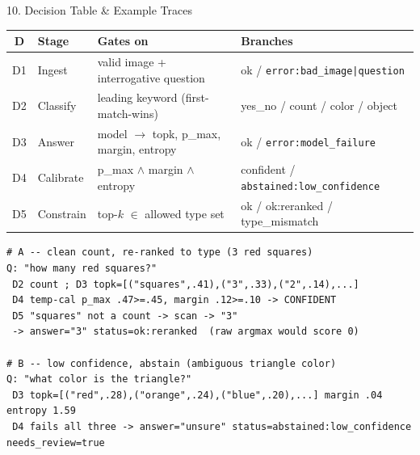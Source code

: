 \documentclass[10pt,aspectratio=169]{beamer}
\begin{document}
\begin{frame}[fragile]{10. Decision Table \& Example Traces}
\begin{table}[h]
\centering\scriptsize
\begin{tabular}{clll}
\toprule
\textbf{D} & \textbf{Stage} & \textbf{Gates on} & \textbf{Branches} \\
\midrule
D1 & Ingest & valid image + interrogative question & ok / \texttt{error:bad\_image|question} \\
D2 & Classify & leading keyword (first-match-wins) & yes\_no / count / color / object \\
D3 & Answer & model $\to$ topk, p\_max, margin, entropy & ok / \texttt{error:model\_failure} \\
D4 & Calibrate & p\_max $\wedge$ margin $\wedge$ entropy & confident / \texttt{abstained:low\_confidence} \\
D5 & Constrain & top-$k$ $\in$ allowed type set & ok / ok:reranked / type\_mismatch \\
\bottomrule
\end{tabular}
\end{table}

\begin{lstlisting}[basicstyle=\ttfamily\tiny]
# A -- clean count, re-ranked to type (3 red squares)
Q: "how many red squares?"
 D2 count ; D3 topk=[("squares",.41),("3",.33),("2",.14),...]
 D4 temp-cal p_max .47>=.45, margin .12>=.10 -> CONFIDENT
 D5 "squares" not a count -> scan -> "3"
 -> answer="3" status=ok:reranked  (raw argmax would score 0)

# B -- low confidence, abstain (ambiguous triangle color)
Q: "what color is the triangle?"
 D3 topk=[("red",.28),("orange",.24),("blue",.20),...] margin .04 entropy 1.59
 D4 fails all three -> answer="unsure" status=abstained:low_confidence needs_review=true
\end{lstlisting}
\end{frame}
\end{document}
